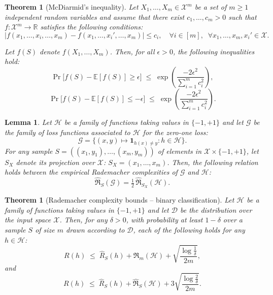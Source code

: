 \documentclass[12pt]{article}
\theoremstyle{definition} %
\theoremstyle{plain} %
\newtheorem{theorem}[definition]{Theorem}
\newtheorem{lemma}[definition]{Lemma}
\theoremstyle{remark} %
\begin{document}
\begin{CJK}{UTF8}{gbsn}
\begin{theorem}[McDiarmid's inequality]
Let $X_1, \ldots, X_m \in \mathcal{X}^m$ be a set of $m \geq 1$ independent random variables 
and assume that there exist $c_1, \ldots, c_m > 0$ such that 
$f: \mathcal{X}^m \to \mathbb{R}$ satisfies the following conditions:
\[
\big| f(x_1, \ldots, x_i, \ldots, x_m) - f(x_1, \ldots, x_i', \ldots, x_m) \big| \leq c_i,
\quad \forall i \in [m], \;\; \forall x_1, \ldots, x_m, x_i' \in \mathcal{X}. \tag{D.15}
\]

Let $f(S)$ denote $f(X_1, \ldots, X_m)$. Then, for all $\epsilon > 0$, the following 
inequalities hold:
\[
\Pr\!\big[f(S) - \mathbb{E}[f(S)] \geq \epsilon\big] 
\;\leq\; \exp\!\left( \frac{-2\epsilon^2}{\sum_{i=1}^m c_i^2} \right), \tag{D.16}
\]
\[
\Pr\!\big[f(S) - \mathbb{E}[f(S)] \leq -\epsilon\big] 
\;\leq\; \exp\!\left( \frac{-2\epsilon^2}{\sum_{i=1}^m c_i^2} \right). \tag{D.17}
\]
\end{theorem}

\begin{lemma}
Let $\mathcal{H}$ be a family of functions taking values in $\{-1,+1\}$ and let 
$\mathcal{G}$ be the family of loss functions associated to $\mathcal{H}$ for the zero-one loss: 
\[
\mathcal{G} = \{(x,y) \mapsto \mathbf{1}_{h(x) \neq y} : h \in \mathcal{H}\}.
\]  
For any sample $S = ((x_1,y_1), \ldots, (x_m,y_m))$ of elements in 
$\mathcal{X} \times \{-1,+1\}$, let $S_X$ denote its projection over $\mathcal{X}$: 
$S_X = (x_1, \ldots, x_m)$.  
Then, the following relation holds between the empirical Rademacher complexities of 
$\mathcal{G}$ and $\mathcal{H}$:
\[
\hat{\mathfrak{R}}_S(\mathcal{G}) = \tfrac{1}{2}\,\hat{\mathfrak{R}}_{S_X}(\mathcal{H}). \tag{3.16}
\]
\end{lemma}

\begin{theorem}[Rademacher complexity bounds -- binary classification]
Let $\mathcal{H}$ be a family of functions taking values in $\{-1,+1\}$ and let 
$\mathcal{D}$ be the distribution over the input space $\mathcal{X}$. 
Then, for any $\delta > 0$, with probability at least $1 - \delta$ over a sample 
$S$ of size $m$ drawn according to $\mathcal{D}$, each of the following holds for any 
$h \in \mathcal{H}$:
\[
R(h) \;\leq\; \hat{R}_S(h) + \mathfrak{R}_m(\mathcal{H}) 
+ \sqrt{\frac{\log \tfrac{1}{\delta}}{2m}}, \tag{3.17}
\]
and
\[
R(h) \;\leq\; \hat{R}_S(h) + \hat{\mathfrak{R}}_S(\mathcal{H}) 
+ 3\sqrt{\frac{\log \tfrac{2}{\delta}}{2m}}. \tag{3.18}
\]
\end{theorem}


\end{CJK}
\end{document}
